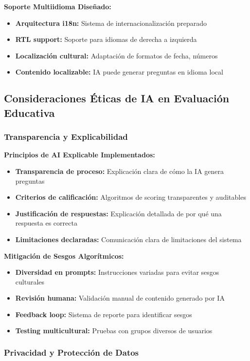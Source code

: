 \documentclass[12pt,a4paper]{report}
\begin{document}
\textbf{Soporte Multiidioma Diseñado:}
\begin{itemize}
\item \textbf{Arquitectura i18n:} Sistema de internacionalización preparado
\item \textbf{RTL support:} Soporte para idiomas de derecha a izquierda
\item \textbf{Localización cultural:} Adaptación de formatos de fecha, números
\item \textbf{Contenido localizable:} IA puede generar preguntas en idioma local
\end{itemize}

\subsection{Consideraciones Éticas de IA en Evaluación Educativa}

\subsubsection{Transparencia y Explicabilidad}

\textbf{Principios de AI Explicable Implementados:}
\begin{itemize}
\item \textbf{Transparencia de proceso:} Explicación clara de cómo la IA genera preguntas
\item \textbf{Criterios de calificación:} Algoritmos de scoring transparentes y auditables
\item \textbf{Justificación de respuestas:} Explicación detallada de por qué una respuesta es correcta
\item \textbf{Limitaciones declaradas:} Comunicación clara de limitaciones del sistema
\end{itemize}

\textbf{Mitigación de Sesgos Algorítmicos:}
\begin{itemize}
\item \textbf{Diversidad en prompts:} Instrucciones variadas para evitar sesgos culturales
\item \textbf{Revisión humana:} Validación manual de contenido generado por IA
\item \textbf{Feedback loop:} Sistema de reporte para identificar sesgos
\item \textbf{Testing multicultural:} Pruebas con grupos diversos de usuarios
\end{itemize}

\subsubsection{Privacidad y Protección de Datos}
\end{document}

